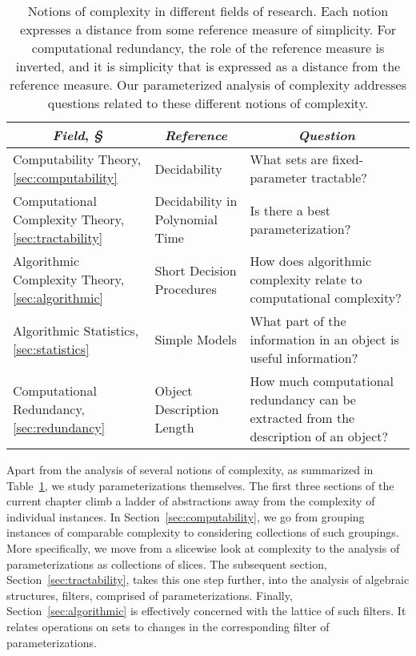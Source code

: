 \begin{table}
  \centering
  \begin{tabular}{p{4cm}p{3cm}p{6.266cm}}
    \multicolumn{1}{c}{\emph{Field}, \emph{\S}} & \multicolumn{1}{c}{\emph{Reference}} & \multicolumn{1}{c}{\emph{Question}} \\
    \hline\noalign{\vspace{2ex}}
    Computability Theory, \hspace*{\fill}\ref{sec:computability} & Decidability & What sets are fixed-parameter tractable? \\[2ex]
    Computational Complexity Theory, \hspace*{\fill}\ref{sec:tractability} & Decidability in Polynomial Time & Is there a best parameterization?\newline \\[2ex]
    Algorithmic Complexity Theory, \hspace*{\fill}\ref{sec:algorithmic} & Short Decision Procedures & How does algorithmic complexity relate to computational complexity? \\[2ex]
    Algorithmic Statistics, \hspace*{\fill}\ref{sec:statistics} & Simple Models & What part of the information in an object is useful information? \\[2ex]
    Computational Redundancy, \hspace*{\fill}\ref{sec:redundancy} & Object Description Length & How much computational redundancy can be extracted from the description of an object?
  \end{tabular}
  \caption{
    Notions of complexity in different fields of research.
    Each notion expresses a distance from some reference measure of simplicity.
    For computational redundancy, the role of the reference measure is inverted, and it is simplicity that is expressed as a distance from the reference measure.
    Our parameterized analysis of complexity addresses questions related to these different notions of complexity.
  }
  \label{tab:summary}
\end{table}

Apart from the analysis of several notions of complexity, as summarized in Table~\ref{tab:summary}, we study parameterizations themselves.
The first three sections of the current chapter climb a ladder of abstractions away from the complexity of individual instances.
In Section~\ref{sec:computability}, we go from grouping instances of comparable complexity to considering collections of such groupings.
More specifically, we move from a slicewise look at complexity to the analysis of parameterizations as collections of slices.
The subsequent section, Section~\ref{sec:tractability}, takes this one step further, into the analysis of algebraic structures, filters, comprised of parameterizations.
Finally, Section~\ref{sec:algorithmic} is effectively concerned with the lattice of such filters.
It relates operations on sets to changes in the corresponding filter of parameterizations.

